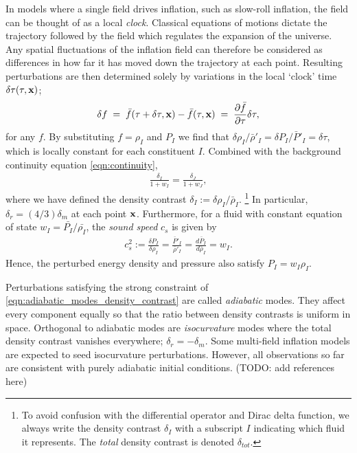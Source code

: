 In models where a single field drives inflation, such as slow-roll inflation, the field can be thought of as a local \textit{clock}. Classical equations of motions dictate the trajectory followed by the field which regulates the expansion of the universe. Any spatial fluctuations of the inflation field can therefore be considered as differences in how far it has moved down the trajectory at each point. Resulting perturbations are then determined solely by variations in the local `clock' time $\delta\tau(\tau,\mathbf{x})$;
\begin{align}
	\delta f \;=\; \bar{f}(\tau + \delta\tau, \mathbf{x}) - \bar{f}(\tau,\mathbf{x}) \;=\; \frac{\partial\bar{f}}{\partial\tau} \delta\tau,
\end{align}
for any $f$. By substituting $f=\rho_I$ and $P_I$ we find that $\delta\rho_I/\bar{\rho}'_I = \delta P_I / \bar{P}'_I = \delta\tau$, which is locally constant for each constituent $I$. Combined with the background continuity equation \ref{eqn:continuity},
\begin{align}
	\frac{\delta_I}{1+w_I} = \frac{\delta_J}{1+w_J}, \label{eqn:adiabatic_modes_density_contrast}
\end{align}
where we have defined the density contrast $\delta_I := \delta\rho_I / \bar{\rho}_I$. \footnote{To avoid confusion with the differential operator and Dirac delta function, we always write the density contrast $\delta_I$ with a subscript $I$ indicating which fluid it represents. The \textit{total} density contrast is denoted $\delta_{tot}$.} In particular, $\delta_r = (4/3) \delta_m$ at each point $\mathbf{x}$. Furthermore, for a fluid with constant equation of state $w_I = \bar{P_I} / \bar{\rho_I}$, the \textit{sound speed} $c_s$ is given by
\begin{align}
	c_s^2 := \frac{\delta P_I}{\delta\rho_I} = \frac{\bar{P}'_I}{\bar{\rho}'_I} = \frac{d\bar{P}_I}{d\bar{\rho}_I} = w_I. \label{eqn:adiabatic_modes_sound_speed}
\end{align}
Hence, the perturbed energy density and pressure also satisfy $P_I = w_I \rho_I$.

Perturbations satisfying the strong constraint of \eqref{eqn:adiabatic_modes_density_contrast} are called \textit{adiabatic} modes. They affect every component equally so that the ratio between density contrasts is uniform in space. Orthogonal to adiabatic modes are \textit{isocurvature} modes where the total density contrast vanishes everywhere; $\delta_r = -\delta_m$. Some multi-field inflation models are expected to seed isocurvature perturbations. However, all observations so far are consistent with purely adiabatic initial conditions. (TODO: add references here)

